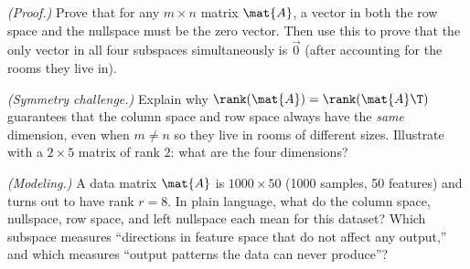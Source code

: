 \begin{exercise}\label{ch15:ex-proof}
\emph{(Proof.)} Prove that for any $m\times n$ matrix $\mat{A}$, a vector in both the row space and
the nullspace must be the zero vector. Then use this to prove that the only vector in all four
subspaces simultaneously is $\vec{0}$ (after accounting for the rooms they live in).
\end{exercise}

\begin{exercise}\label{ch15:ex-transpose}
\emph{(Symmetry challenge.)} Explain why $\rank(\mat{A})=\rank(\mat{A}\T)$ guarantees that the
column space and row space always have the \emph{same} dimension, even when $m\ne n$ so they live
in rooms of different sizes. Illustrate with a $2\times 5$ matrix of rank $2$: what are the four
dimensions?
\end{exercise}

\begin{exercise}\label{ch15:ex-application}
\emph{(Modeling.)} A data matrix $\mat{A}$ is $1000\times 50$ (1000 samples, 50 features) and turns
out to have rank $r=8$. In plain language, what do the column space, nullspace, row space, and left
nullspace each mean for this dataset? Which subspace measures ``directions in feature space that do
not affect any output,'' and which measures ``output patterns the data can never produce''?
\end{exercise}

